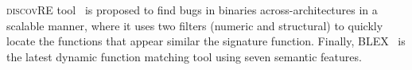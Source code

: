 \textsc{\small discovRE} tool~\cite{sebastian2016discovre} is proposed to find bugs in binaries across-architectures in a scalable manner, where it uses two filters (numeric and structural) to quickly locate the functions that appear similar  the signature function.
Finally, \textsc{\small BLEX}~\cite{egele2014blanket} is the latest dynamic function matching tool using seven semantic features.%




